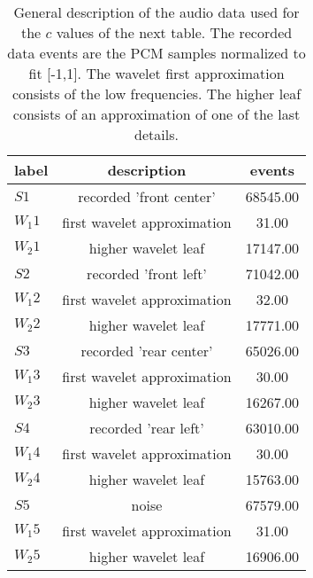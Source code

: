 \begin{table}[h!]
\begin{center}
\begin{tabular}{| l | c | c |}\hline
label & description & events \\\hline
$S1$ & recorded 'front center'  & 68545.00 \\\hline
$W_1 1$ & first wavelet approximation  & 31.00 \\\hline
$W_2 1$ & higher wavelet leaf  & 17147.00 \\\hline
$S2$ & recorded 'front left'  & 71042.00 \\\hline
$W_1 2$ & first wavelet approximation  & 32.00 \\\hline
$W_2 2$ & higher wavelet leaf  & 17771.00 \\\hline
$S3$ & recorded 'rear center'  & 65026.00 \\\hline
$W_1 3$ & first wavelet approximation  & 30.00 \\\hline
$W_2 3$ & higher wavelet leaf  & 16267.00 \\\hline
$S4$ & recorded 'rear left'  & 63010.00 \\\hline
$W_1 4$ & first wavelet approximation  & 30.00 \\\hline
$W_2 4$ & higher wavelet leaf  & 15763.00 \\\hline
$S5$ & noise  & 67579.00 \\\hline
$W_1 5$ & first wavelet approximation  & 31.00 \\\hline
$W_2 5$ & higher wavelet leaf  & 16906.00 \\\hline
\end{tabular}
\caption{General description of the audio data used for the $c$ values of the next table.
The recorded data events are the PCM samples normalized to fit [-1,1].
The wavelet first approximation consists of the low frequencies.
The higher leaf consists of an approximation of one of the last details.}
\end{center}
\end{table}